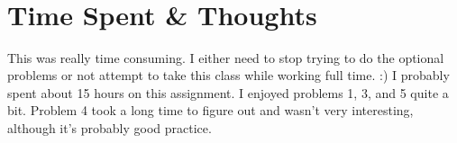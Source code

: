 \documentclass[12pt]{article}
\begin{document}
\noindent\ignorespacesafterend
{} \hspace{2em} \\
 \hspace{2em} \\
 \hspace{2em} \\
 \hspace{2em} \\
 \hspace{2em} 





\section{Time Spent \& Thoughts}
This was really time consuming. I either need to stop trying to do the optional problems or not attempt to take this class while working full time. :) I probably spent about 15 hours on this assignment. I enjoyed problems 1, 3, and 5 quite a bit. Problem 4 took a long time to figure out and wasn't very interesting, although it's probably good practice.
\end{document}
